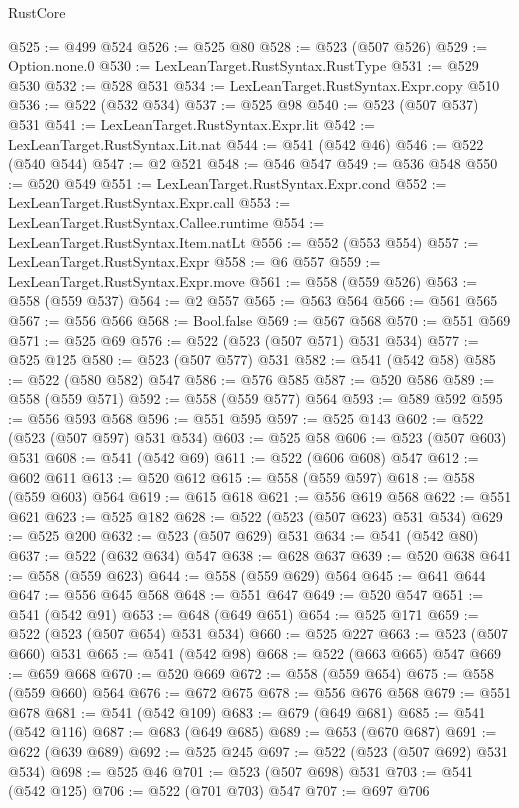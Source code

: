 \begin{lexlean}{RustCore}
\begin{coremodule}
@525 := @499 @524
@526 := @525 @80
@528 := @523 (@507 @526)
@529 := Option.none.{0}
@530 := LexLeanTarget.RustSyntax.RustType
@531 := @529 @530
@532 := @528 @531
@534 := LexLeanTarget.RustSyntax.Expr.copy @510
@536 := @522 (@532 @534)
@537 := @525 @98
@540 := @523 (@507 @537) @531
@541 := LexLeanTarget.RustSyntax.Expr.lit
@542 := LexLeanTarget.RustSyntax.Lit.nat
@544 := @541 (@542 @46)
@546 := @522 (@540 @544)
@547 := @2 @521
@548 := @546 @547
@549 := @536 @548
@550 := @520 @549
@551 := LexLeanTarget.RustSyntax.Expr.cond
@552 := LexLeanTarget.RustSyntax.Expr.call
@553 := LexLeanTarget.RustSyntax.Callee.runtime
@554 := LexLeanTarget.RustSyntax.Item.natLt
@556 := @552 (@553 @554)
@557 := LexLeanTarget.RustSyntax.Expr
@558 := @6 @557
@559 := LexLeanTarget.RustSyntax.Expr.move
@561 := @558 (@559 @526)
@563 := @558 (@559 @537)
@564 := @2 @557
@565 := @563 @564
@566 := @561 @565
@567 := @556 @566
@568 := Bool.false
@569 := @567 @568
@570 := @551 @569
@571 := @525 @69
@576 := @522 (@523 (@507 @571) @531 @534)
@577 := @525 @125
@580 := @523 (@507 @577) @531
@582 := @541 (@542 @58)
@585 := @522 (@580 @582) @547
@586 := @576 @585
@587 := @520 @586
@589 := @558 (@559 @571)
@592 := @558 (@559 @577) @564
@593 := @589 @592
@595 := @556 @593 @568
@596 := @551 @595
@597 := @525 @143
@602 := @522 (@523 (@507 @597) @531 @534)
@603 := @525 @58
@606 := @523 (@507 @603) @531
@608 := @541 (@542 @69)
@611 := @522 (@606 @608) @547
@612 := @602 @611
@613 := @520 @612
@615 := @558 (@559 @597)
@618 := @558 (@559 @603) @564
@619 := @615 @618
@621 := @556 @619 @568
@622 := @551 @621
@623 := @525 @182
@628 := @522 (@523 (@507 @623) @531 @534)
@629 := @525 @200
@632 := @523 (@507 @629) @531
@634 := @541 (@542 @80)
@637 := @522 (@632 @634) @547
@638 := @628 @637
@639 := @520 @638
@641 := @558 (@559 @623)
@644 := @558 (@559 @629) @564
@645 := @641 @644
@647 := @556 @645 @568
@648 := @551 @647
@649 := @520 @547
@651 := @541 (@542 @91)
@653 := @648 (@649 @651)
@654 := @525 @171
@659 := @522 (@523 (@507 @654) @531 @534)
@660 := @525 @227
@663 := @523 (@507 @660) @531
@665 := @541 (@542 @98)
@668 := @522 (@663 @665) @547
@669 := @659 @668
@670 := @520 @669
@672 := @558 (@559 @654)
@675 := @558 (@559 @660) @564
@676 := @672 @675
@678 := @556 @676 @568
@679 := @551 @678
@681 := @541 (@542 @109)
@683 := @679 (@649 @681)
@685 := @541 (@542 @116)
@687 := @683 (@649 @685)
@689 := @653 (@670 @687)
@691 := @622 (@639 @689)
@692 := @525 @245
@697 := @522 (@523 (@507 @692) @531 @534)
@698 := @525 @46
@701 := @523 (@507 @698) @531
@703 := @541 (@542 @125)
@706 := @522 (@701 @703) @547
@707 := @697 @706

\end{coremodule}
\end{lexlean}
